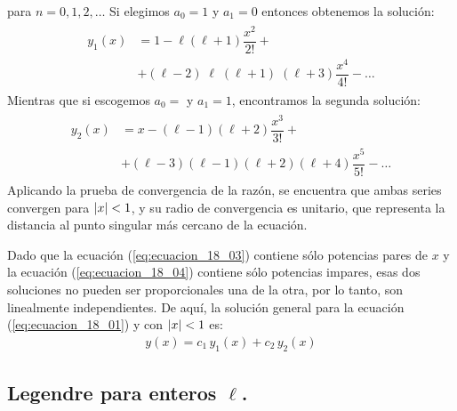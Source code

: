 \documentclass[12pt]{article}
\numberwithin{equation}{section}
\begin{document}
para $n = 0, 1, 2, \ldots$
Si elegimos $a_{0} = 1$ y $a_{1} = 0$ entonces obtenemos la solución:
\begin{align}
\begin{aligned}
y_{1} (x) &= 1 - \ell (\ell + 1) \dfrac{x^{2}}{2!} + \\
&+ (\ell - 2)\; \ell \; (\ell + 1)\;(\ell + 3) \dfrac{x^{4}}{4!} - \ldots
\end{aligned}
\label{eq:ecuacion_18_03}
\end{align}
Mientras que si escogemos $a_{0} = $ y $ a_{1} = 1 $, encontramos la segunda solución:
\begin{align}
\begin{aligned}
y_{2} (x) &= x - (\ell - 1)(\ell + 2) \dfrac{x^{3}}{3!} + \\[0.5em]
&+ (\ell - 3) (\ell - 1)(\ell + 2)(\ell + 4) \dfrac{x^{5}}{5!} - \ldots
\label{eq:ecuacion_18_04}
\end{aligned}
\end{align}
Aplicando la prueba de convergencia de la razón, se encuentra que ambas series convergen para $\abs{x} < 1$, y su radio de convergencia es unitario, que representa la distancia al punto singular más cercano de la ecuación.
\par
Dado que la ecuación (\ref{eq:ecuacion_18_03}) contiene sólo potencias pares de $x$ y la ecuación (\ref{eq:ecuacion_18_04}) contiene sólo potencias impares,  esas dos soluciones no pueden ser proporcionales una de la otra, por lo tanto, son linealmente independientes. De aquí, la solución general para la ecuación (\ref{eq:ecuacion_18_01}) y con $\abs{x} < 1$ es:
\begin{align*}
y (x) = c_{1} \, y_{1} (x) + c_{2} \, y_{2} (x)
\end{align*}

\subsection{Legendre para enteros \texorpdfstring{$\ell$}{l}.}
\end{document}
